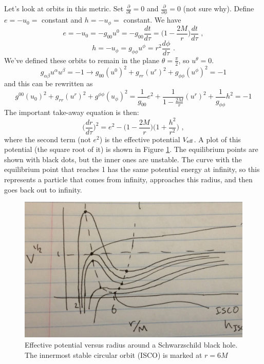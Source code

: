 Let's look at orbits in this metric. Set $\frac{\partial}{\partial t} = 0$ and $\frac{\partial}{\partial \phi} = 0$ (not sure why). Define $e = -u_0 = $ constant and $h = -u_\phi =$ constant. We have
\begin{equation}
e = -u_0 = -g_{00} u^0 = -g_{00} \frac{dt}{d\tau} = \biggl( 1 - \frac{2M}{r} \biggr) \frac{dt}{d\tau}\,\,,
\end{equation}
\begin{equation}
h = -u_\phi = g_{\phi \phi} u^\phi = r^2 \frac{d\phi}{d\tau}\,\,.
\end{equation}
We've defined these orbits to remain in the plane $\theta = \frac{\pi}{2}$, so $u^\theta = 0$.
\begin{equation}
g_{\alpha \beta}u^\alpha u^\beta = -1 \rightarrow g_{00} (u^0)^2 + g_{rr}(u^r)^2 + g_{\phi \phi} (u^\phi)^2 = -1
\end{equation}
and this can be rewritten as
\begin{equation}
g^{00} (u_0)^2 + g_{rr}(u^r)^2 + g^{\phi \phi} (u_\phi)^2 = \frac{1}{g_{00}} e^2 + \frac{1}{1 - \frac{2M}{r}}(u^r)^2 + \frac{1}{g_{\phi \phi}} h^2 = -1
\end{equation}
The important take-away equation is then:
\begin{equation}
\biggl(\frac{dr}{d\tau} \biggr)^2 = e^2 - \biggl( 1 - \frac{2M}{r} \biggr) \biggl( 1 + \frac{h^2}{r^2} \biggr)\,\,,
\end{equation}
where the second term (not $e^2$) is the effective potential $V_{\rm eff}$. A plot of this potential (the square root of it) is shown in Figure \ref{f:veff}. The equilibrium points are shown with black dots, but the inner ones are unstable. The curve with the equilibrium point that reaches 1 has the same potential energy at infinity, so this represents a particle that comes from infinity, approaches this radius, and then goes back out to infinity.


\begin{figure}[!h]
\begin{center}
\includegraphics[width=\textwidth]{veff.jpg}
\caption{Effective potential versus radius around a Schwarzschild black hole. The innermost stable circular orbit (ISCO) is marked at $r = 6M$ \label{f:veff}}
\end{center}
\end{figure}

